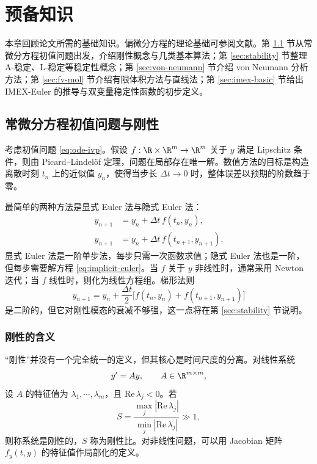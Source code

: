\chapter{预备知识}

本章回顾论文所需的基础知识。偏微分方程的理论基础可参阅文献\cite{zhou2005}。第 \ref{sec:ode-stiff} 节从常微分方程初值问题出发，介绍刚性概念与几类基本算法；第 \ref{sec:stability} 节整理 A-稳定、L-稳定等稳定性概念；第 \ref{sec:von-neumann} 节介绍 von Neumann 分析方法；第 \ref{sec:fv-mol} 节介绍有限体积方法与直线法；第 \ref{sec:imex-basic} 节给出 IMEX-Euler 的推导与双变量稳定性函数的初步定义。

\section{常微分方程初值问题与刚性}
\label{sec:ode-stiff}

考虑初值问题 \eqref{eq:ode-ivp}。假设 $f:\R\times\R^m\to\R^m$ 关于 $y$ 满足 Lipschitz 条件，则由 Picard--Lindel\"of 定理，问题在局部存在唯一解。数值方法的目标是构造离散时刻 $t_n$ 上的近似值 $y_n$，使得当步长 $\Delta t\to0$ 时，整体误差以预期的阶数趋于零。

最简单的两种方法是显式 Euler 法与隐式 Euler 法：
\begin{align}
  y_{n+1} &= y_n+\Delta t\,f(t_n,y_n), \label{eq:explicit-euler}\\
  y_{n+1} &= y_n+\Delta t\,f(t_{n+1},y_{n+1}). \label{eq:implicit-euler}
\end{align}
显式 Euler 法是一阶单步法，每步只需一次函数求值；隐式 Euler 法也是一阶，但每步需要解方程 \eqref{eq:implicit-euler}。当 $f$ 关于 $y$ 非线性时，通常采用 Newton 迭代；当 $f$ 线性时，则化为线性方程组。梯形法则
\begin{equation}
  y_{n+1}=y_n+\frac{\Delta t}{2}\bigl[f(t_n,y_n)+f(t_{n+1},y_{n+1})\bigr]
  \label{eq:trapezoidal}
\end{equation}
是二阶的，但它对刚性模态的衰减不够强，这一点将在第 \ref{sec:stability} 节说明。

\subsection{刚性的含义}

“刚性”并没有一个完全统一的定义，但其核心是时间尺度的分离。对线性系统
\begin{equation}
  y'=Ay,\qquad A\in\R^{m\times m},
  \label{eq:linear-system}
\end{equation}
设 $A$ 的特征值为 $\lambda_1,\cdots,\lambda_m$，且 $\mathrm{Re}\,\lambda_j<0$。若
\begin{equation}
  S=\frac{\max_j|\mathrm{Re}\,\lambda_j|}{\min_j|\mathrm{Re}\,\lambda_j|}\gg1,
  \label{eq:stiffness-ratio}
\end{equation}
则称系统是刚性的，$S$ 称为刚性比。对非线性问题，可以用 Jacobian 矩阵 $f_y(t,y)$ 的特征值作局部化的定义。

